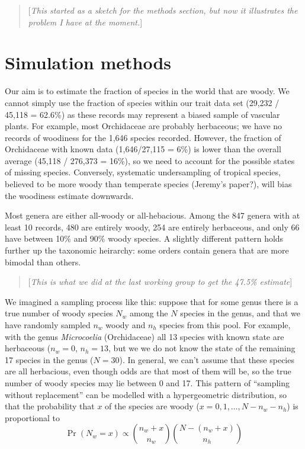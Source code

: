 \documentclass[12pt]{article}
\newcommand{\mycomment}[1]{\begin{quote}[\textit{#1}]\end{quote}}
\begin{document}
\mycomment{This started as a sketch for the methods section, but now
  it illustrates the problem I have at the moment.}

\section{Simulation methods}

Our aim is to estimate the fraction of species in the world that are
woody.  We cannot simply use the fraction of species within our trait
data set (29,232 / 45,118 = 62.6\%) as these records may represent a
biased sample of vascular plants.  
%
For example, most Orchidaceae are probably herbaceous; we have no
records of woodiness for the 1,646 species recorded.  However, the
fraction of Orchidaceae with known data (1,646/27,115 = 6\%) is lower
than the overall average (45,118 / 276,373 = 16\%), so we need to
account for the possible states of missing species.
%
Conversely, systematic undersampling of tropical species, believed to
be more woody than temperate species (Jeremy's paper?), will bias the
woodiness estimate downwards.

Most genera are either all-woody or all-hebacious.  Among the 847
genera with at least 10 records, 480 are entirely woody, 254 are
entirely herbaceous, and only 66 have between 10\% and 90\% woody
species.  A slightly different pattern holds further up the taxonomic
heirarchy: some orders contain genera that are more bimodal than
others.

\mycomment{This is what we did at the last working group to get the
  47.5\% estimate}

We imagined a sampling process like this: suppose that for some genus
there is a true number of woody species $N_w$ among the $N$ species in
the genus, and that we have randomly sampled $n_w$ woody and $n_h$
species from this pool.  
%
For example, with the genus \textit{Microcoelia} (Orchidaceae) all 13
species with known state are herbaceous ($n_w = 0$, $n_h = 13$, but we
we do not know the state of the remaining 17 species in the genus ($N
= 30$).  In general, we can't assume that these species are all
herbacious, even though odds are that most of them will be, so the
true number of woody species may lie between 0 and 17.
%
This pattern of ``sampling without replacement'' can be modelled with
a hypergeometric distribution, so that the probability that $x$ of the
species are woody ($x = 0, 1, \ldots, N - n_w - n_h$) is proportional
to
\begin{equation}
  \Pr(N_w = x) \propto {n_w + x \choose n_w}
    {N - (n_w + x) \choose n_h}
\end{equation}
\end{document}
